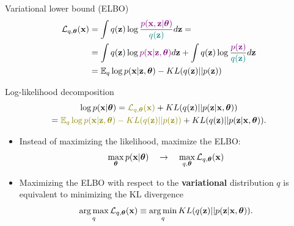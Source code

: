 \documentclass{beamer}
\begin{document}
\begin{frame}{Variational lower bound (ELBO)}
	\vspace{-0.3cm}
	\begin{align*}
		\mathcal{L}_{q, \boldsymbol{\theta}}(\mathbf{x}) &= \int q(\mathbf{z}) \log \frac{\color{violet}p(\mathbf{x}, \mathbf{z} | \boldsymbol{\theta})}{\color{teal}q(\mathbf{z})}d\mathbf{z} = \\ 
		&= \int q(\mathbf{z}) \log {\color{violet}p(\mathbf{x}| \mathbf{z}, \boldsymbol{\theta})} d\mathbf{z} + \int q(\mathbf{z}) \log \frac{\color{violet}p(\mathbf{z})}{\color{teal}q(\mathbf{z})}d\mathbf{z} \\ 
		&= \mathbb{E}_{q} \log p(\mathbf{x} | \mathbf{z}, \boldsymbol{\theta}) - KL (q(\mathbf{z}) || p(\mathbf{z}))
	\end{align*}
	\vspace{-0.5cm}
	\begin{block}{Log-likelihood decomposition}
		\vspace{-0.8cm}
		\begin{multline*}
			\log p(\bx| \btheta) = {\color{olive}\cL_{q, \btheta}(\bx)} + KL(q(\bz) || p(\bz|\bx, \btheta)) \\ = {\color{olive}\mathbb{E}_{q} \log p(\bx | \bz, \btheta) - KL (q(\bz) || p(\bz))} + KL(q(\bz) || p(\bz|\bx, \btheta)).
		\end{multline*}
		\vspace{-0.7cm}
	\end{block}
	\begin{itemize}
		\item Instead of maximizing the likelihood, maximize the ELBO:
		\[
		\max_{\boldsymbol{\theta}} p(\mathbf{x} | \boldsymbol{\theta}) \quad \rightarrow \quad \max_{q, \boldsymbol{\theta}} \mathcal{L}_{q, \boldsymbol{\theta}}(\mathbf{x})
		\]
		\item Maximizing the ELBO with respect to the \textbf{variational} distribution $q$ is equivalent to minimizing the KL divergence
		\[
		\operatorname*{arg\,max}_q \mathcal{L}_{q, \boldsymbol{\theta}}(\mathbf{x}) \equiv \operatorname*{arg\,min}_q KL(q(\mathbf{z}) || p(\mathbf{z}|\mathbf{x}, \boldsymbol{\theta})).
		\]
	\end{itemize}
\end{frame}
\end{document}
